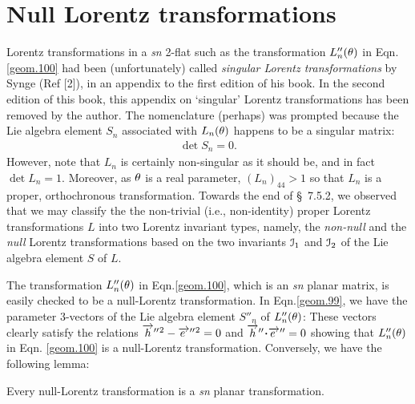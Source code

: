 {\section{Null Lorentz transformations}
Lorentz transformations in a  \textsl{sn} 2-flat such 
as the transformation $L''_{n}({\theta})$ in  
Eqn.\eqref{geom.100} had been (unfortunately) called 
\textsl{singular  Lorentz transformations} by Synge 
(Ref [2]), in an appendix to the first edition of his 
book. In the second edition of this book, this 
appendix 
on `singular' Lorentz transformations has been removed 
by the author. The nomenclature (perhaps) was prompted 
because the Lie algebra element $S_n$ associated with 
$L_{n}({\theta})$ happens to be a singular matrix:
\begin{align}\label{geom.101}
 \det{S_n}=0.
\end{align}
However, note that $L_n$ is certainly non-singular as 
it  should be, and in fact  $\det{L_n}=1$.  Moreover, 
as ${\theta}$ is a real parameter,  $(L_n)_{44}>1$ so that 
$L_n$ is a proper, orthochronous transformation. 
Towards the end of \S~7.5.2,  we observed that we may 
classify the the non-trivial (i.e., non-identity) 
proper  Lorentz transformations $L$ into two Lorentz 
invariant types, namely, the \textsl{non-null} and the 
\textsl{null}  Lorentz  transformations based on the 
two invariants $\EuScript{I}_1$ and $\EuScript{I}_2$ 
of 
the Lie algebra element $S$ of $L$.

The transformation $L''_{n}({\theta})$ in 
Eqn.\eqref{geom.100}, which is an  \textsl{sn} planar 
matrix,  is  easily checked to be a  null-Lorentz 
transformation. In Eqn.\eqref{geom.99}, we have the 
parameter 3-vectors of the Lie algebra element  
$S''_{n}$ of $L''_{n}({\theta})$: These vectors clearly 
satisfy the relations $\overrightarrow{h}''{}^2 
-\overrightarrow{e\:}''{}^2=0$ and $\veca{h}'' \dotp 
\veca{e\:}''=0$ showing that  $L''_n({\theta})$  in Eqn. 
\eqref{geom.100} is a null-Lorentz transformation. 
Conversely, we have the following lemma:

\Lem Every null-Lorentz transformation is a  
\textsl{sn} planar transformation.

}
